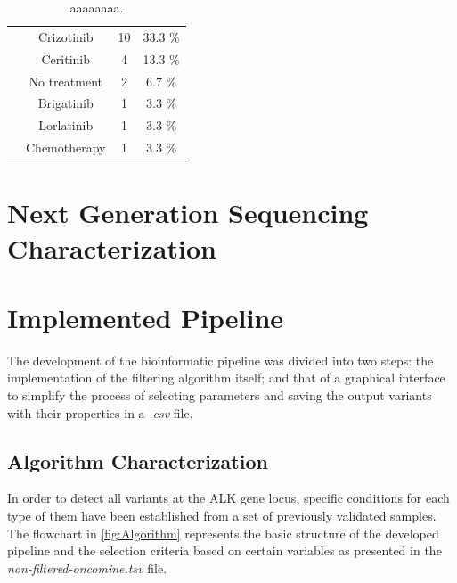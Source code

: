 \begin{table}[ht]
{\begin{tabular}{cccc}
\rowcolor[HTML]{FFFFFF}
\cellcolor[HTML]{FFFFFF} & Crizotinib & 10 & 33.3 \% \\
\rowcolor[HTML]{FFFFFF}
\cellcolor[HTML]{FFFFFF} & Ceritinib & 4 & 13.3 \% \\
\rowcolor[HTML]{FFFFFF}
\cellcolor[HTML]{FFFFFF} & No treatment & 2 & 6.7 \% \\
\rowcolor[HTML]{FFFFFF}
\cellcolor[HTML]{FFFFFF} & Brigatinib & 1 & 3.3 \% \\
\rowcolor[HTML]{FFFFFF}
\cellcolor[HTML]{FFFFFF} & Lorlatinib & 1 & 3.3 \% \\
\rowcolor[HTML]{FFFFFF}
\multirow{-7}{*}{\cellcolor[HTML]{FFFFFF}\textbf{Treatment}} & Chemotherapy & 1 & 3.3 \%
\end{tabular}}
\caption{aaaaaaaa.}
\label{tab:Patients}
\end{table}

\section{Next Generation Sequencing Characterization}


\section{Implemented Pipeline}



The development of the bioinformatic pipeline was divided into two steps: the implementation of the filtering algorithm itself; and that of a graphical interface to simplify the process of selecting parameters and saving the output variants with their properties in a \textit{.csv} file.

\subsection{Algorithm Characterization}

In order to detect all variants at the ALK gene locus, specific conditions for each type of them have been established from a set of previously validated samples. The flowchart in \autoref{fig:Algorithm} represents the basic structure of the developed pipeline and the selection criteria based on certain variables as presented in the \textit{non-filtered-oncomine.tsv} file.

